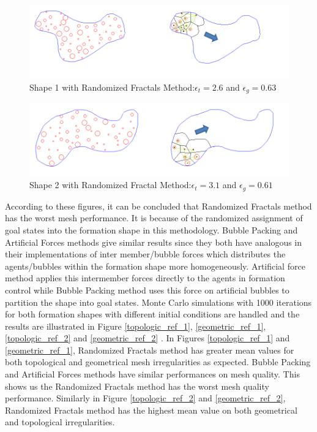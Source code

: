 \begin{figure}[H]
\caption{Shape 1 with Randomized Fractals Method:$\epsilon_t = 2.6$ and $\epsilon_g = 0.63$}
\label{fififi5}
\centerline{\includegraphics[scale = 0.70]{Randomized_Fractals_Mesh_1}}
\end{figure} 	

\begin{figure}[H]
\caption{Shape 2 with Randomized Fractal Method:$\epsilon_t = 3.1$ and $\epsilon_g = 0.61$}
\label{fififi6}
\centerline{\includegraphics[scale = 0.65]{Randomized_Fractals_Mesh_2}}
\end{figure} 	

According to these figures, it can be concluded that Randomized Fractals method has the worst mesh performance. It is because of the randomized assignment of goal states into the formation shape in this methodology. Bubble Packing and Artificial Forces methods give similar results since they both have analogous in their implementations of inter member/bubble forces which distributes the agents/bubbles within the formation shape more homogeneously. Artificial force method applies this intermember forces directly to the agents in formation control while Bubble Packing method uses this force on artificial bubbles to partition the shape into goal states. Monte Carlo simulations with 1000 iterations for both formation shapes with different initial conditions are handled and the results are illustrated in Figure \ref{topologic_ref_1}, \ref{geometric_ref_1}, \ref{topologic_ref_2} and \ref{geometric_ref_2} . In Figures \ref{topologic_ref_1} and \ref{geometric_ref_1}, Randomized Fractals method has greater mean values for both topological and geometrical mesh irregularities as expected.  Bubble Packing and Artificial Forces methods have similar performances on mesh quality. This shows us the Randomized Fractals method has the worst mesh quality performance. Similarly in Figure \ref{topologic_ref_2} and \ref{geometric_ref_2}, Randomized Fractals method has the highest mean value on both geometrical and topological irregularities.
		
